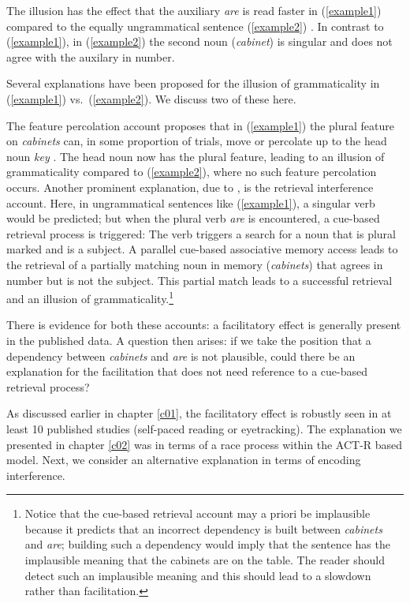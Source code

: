 \documentclass{cambridge7A}\usepackage[]{graphicx}\usepackage[]{color}
\begin{document}
The illusion has the effect that
 the auxiliary \textit{are} is read faster in (\ref{example1}) compared to the equally ungrammatical sentence (\ref{example2}) \citep[see][for a review]{JaegerEngelmannVasishth2017}. In contrast to (\ref{example1}), in (\ref{example2}) the second noun (\textit{cabinet}) is singular and does not agree with the auxilary in number.

Several explanations have been proposed for the illusion of grammaticality in (\ref{example1}) vs.\ (\ref{example2}).
We discuss two of these here.

The feature percolation account proposes that in (\ref{example1}) the plural feature on \textit{cabinets} can, in some proportion of trials, move or percolate up to the head noun \textit{key}  \citep[see][for recent evidence for this model]{patson2016misinterpretations}. The head noun now has the plural feature, leading to an illusion of grammaticality compared to (\ref{example2}), where no such feature percolation occurs. 
Another prominent explanation, due to \cite{WagersLauPhillips2009}, is the retrieval interference account. Here, in ungrammatical sentences like (\ref{example1}), a singular verb would be predicted; but when the plural verb \textit{are} is encountered, a cue-based retrieval process is triggered: The verb triggers a search for a noun that is plural marked and is a subject. A parallel cue-based associative memory access leads to the retrieval of a partially matching noun in memory (\textit{cabinets}) that agrees in number but is not the subject. This partial match leads to a successful retrieval and an illusion of grammaticality.\footnote{Notice that the cue-based retrieval account may a priori be implausible because it predicts that an incorrect dependency is built between \textit{cabinets} and \textit{are}; building such a dependency would imply that the sentence has the implausible meaning that the cabinets are on the table. The reader should detect such an implausible meaning and this should lead to a slowdown rather than facilitation.} 

There is evidence for both these accounts: a facilitatory effect is generally present in the published data. 
A question then arises: if we take the position that a dependency between \textit{cabinets} and \textit{are} is not plausible, could there be an explanation for the facilitation that does not need reference to a cue-based retrieval process?

As discussed earlier in chapter \ref{c01}, the facilitatory effect is robustly seen in at least 10 published studies (self-paced reading or eyetracking). The explanation we presented in chapter \ref{c02} was in terms of a race process within the ACT-R based model. Next, we consider an alternative explanation in terms of encoding interference.
\end{document}
